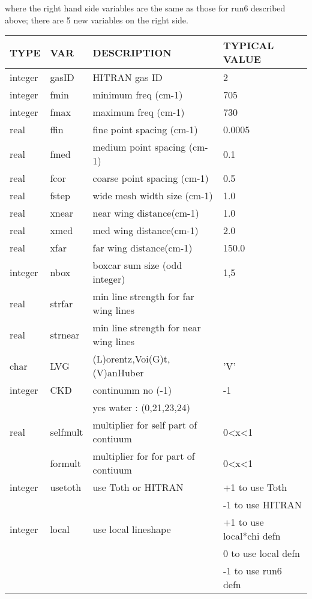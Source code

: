 \documentclass[11pt]{article}
\begin{document}
where the right hand side variables are the same as those for run6 
described above; there are 5 new variables on the right side.

\begin{longtable}{llll}
  TYPE  &   VAR  &         DESCRIPTION  &            TYPICAL VALUE\\
\hline
integer & gasID  &       HITRAN gas ID      &            2\\
\hline

integer & fmin    &      minimum freq (cm-1) &          705\\
integer & fmax    &      maximum freq (cm-1) &          730\\
\hline

real   &  ffin    &      fine point spacing (cm-1) &    0.0005\\
real   &  fmed    &      medium point spacing (cm-1)&   0.1\\
real   &  fcor    &      coarse point spacing (cm-1)  & 0.5\\
\hline

real   &  fstep   &      wide mesh width size (cm-1) &    1.0\\
real   &  xnear   &      near wing distance(cm-1)    &    1.0\\
real   &  xmed    &      med wing distance(cm-1)     &    2.0\\
real   &  xfar    &      far wing distance(cm-1)     &    150.0\\
\hline

integer & nbox     &     boxcar sum size (odd integer) &  1,5\\
\hline

real   &  strfar   &    min line strength for far wing lines & \\
real   &  strnear  &    min line strength for near wing lines& \\
\hline

char   &  LVG      &      (L)orentz,Voi(G)t,(V)anHuber  &  'V' \\
integer &  CKD     &       continumm no (-1)            &   -1 \\
        &          &       yes water : (0,21,23,24)    & \\
\hline

real    &  selfmult &       multiplier for self part of contiuum &  0<x<1 \\
        &  formult  &       multiplier for for  part of contiuum  & 0<x<1 \\
\hline

integer & usetoth &        use Toth or HITRAN &           +1 to use Toth \\
        &         &                           &          -1 to use HITRAN \\
\hline

integer & local &         use local lineshape   & +1 to use local*chi defn\\
        &       &                                  &  0 to use local defn \\
        &       &                                  & -1 to use run6 defn\\
\hline
\end{longtable}
\end{document}
